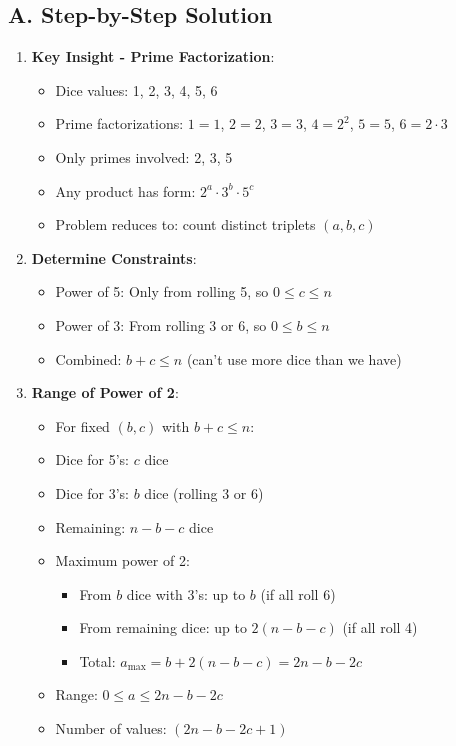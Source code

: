 \documentclass[12pt]{article}
\begin{document}
\begin{solutionbox}
\subsection*{A. Step-by-Step Solution}
\begin{enumerate}[leftmargin=*]
    \item \textbf{Key Insight - Prime Factorization}: 
    \begin{itemize}
        \item Dice values: 1, 2, 3, 4, 5, 6
        \item Prime factorizations: $1=1$, $2=2$, $3=3$, $4=2^2$, $5=5$, $6=2 \cdot 3$
        \item Only primes involved: 2, 3, 5
        \item Any product has form: $2^a \cdot 3^b \cdot 5^c$
        \item Problem reduces to: count distinct triplets $(a, b, c)$
    \end{itemize}
    
    \item \textbf{Determine Constraints}: 
    \begin{itemize}
        \item Power of 5: Only from rolling 5, so $0 \leq c \leq n$
        \item Power of 3: From rolling 3 or 6, so $0 \leq b \leq n$
        \item Combined: $b + c \leq n$ (can't use more dice than we have)
    \end{itemize}
    
    \item \textbf{Range of Power of 2}: 
    \begin{itemize}
        \item For fixed $(b, c)$ with $b + c \leq n$:
        \item Dice for 5's: $c$ dice
        \item Dice for 3's: $b$ dice (rolling 3 or 6)
        \item Remaining: $n - b - c$ dice
        \item Maximum power of 2:
        \begin{itemize}
            \item From $b$ dice with 3's: up to $b$ (if all roll 6)
            \item From remaining dice: up to $2(n-b-c)$ (if all roll 4)
            \item Total: $a_{\max} = b + 2(n-b-c) = 2n - b - 2c$
        \end{itemize}
        \item Range: $0 \leq a \leq 2n - b - 2c$
        \item Number of values: $(2n - b - 2c + 1)$
    \end{itemize}
    

\end{enumerate}
\end{solutionbox}
\end{document}
